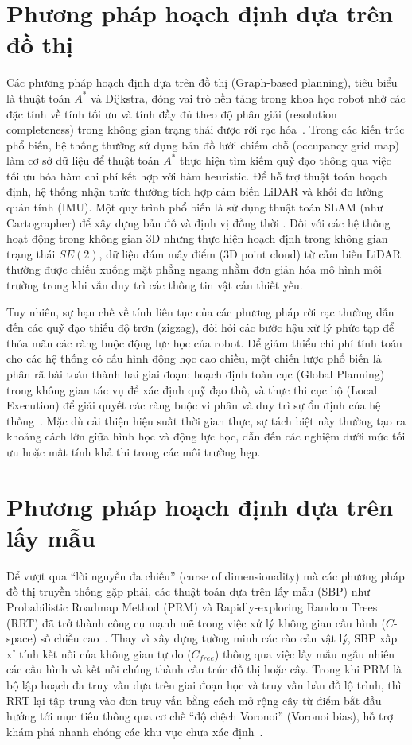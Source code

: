 \section{Phương pháp hoạch định dựa trên đồ thị}

Các phương pháp hoạch định dựa trên đồ thị (Graph-based planning), tiêu biểu là thuật toán $A^*$ và Dijkstra, đóng vai trò nền tảng trong khoa học robot nhờ các đặc tính về tính tối ưu và tính đầy đủ theo độ phân giải (resolution completeness) trong không gian trạng thái được rời rạc hóa~\cite{LaValle2006}. Trong các kiến trúc phổ biến, hệ thống thường sử dụng bản đồ lưới chiếm chỗ (occupancy grid map) làm cơ sở dữ liệu để thuật toán $A^*$ thực hiện tìm kiếm quỹ đạo thông qua việc tối ưu hóa hàm chi phí kết hợp với hàm heuristic. Để hỗ trợ thuật toán hoạch định, hệ thống nhận thức thường tích hợp cảm biến LiDAR và khối đo lường quán tính (IMU). Một quy trình phổ biến là sử dụng thuật toán SLAM (như Cartographer) để xây dựng bản đồ và định vị đồng thời \cite{TandonEtAl2024}. Đối với các hệ thống hoạt động trong không gian 3D nhưng thực hiện hoạch định trong không gian trạng thái $SE(2)$, dữ liệu đám mây điểm (3D point cloud) từ cảm biến LiDAR thường được chiếu xuống mặt phẳng ngang nhằm đơn giản hóa mô hình môi trường trong khi vẫn duy trì các thông tin vật cản thiết yếu.

Tuy nhiên, sự hạn chế về tính liên tục của các phương pháp rời rạc thường dẫn đến các quỹ đạo thiếu độ trơn (zigzag), đòi hỏi các bước hậu xử lý phức tạp để thỏa mãn các ràng buộc động lực học của robot. Để giảm thiểu chi phí tính toán cho các hệ thống có cấu hình động học cao chiều, một chiến lược phổ biến là phân rã bài toán thành hai giai đoạn: hoạch định toàn cục (Global Planning) trong không gian tác vụ để xác định quỹ đạo thô, và thực thi cục bộ (Local Execution) để giải quyết các ràng buộc vi phân và duy trì sự ổn định của hệ thống~\cite{TandonEtAl2024}. Mặc dù cải thiện hiệu suất thời gian thực, sự tách biệt này thường tạo ra khoảng cách lớn giữa hình học và động lực học, dẫn đến các nghiệm dưới mức tối ưu hoặc mất tính khả thi trong các môi trường hẹp.

\section{Phương pháp hoạch định dựa trên lấy mẫu}

Để vượt qua ``lời nguyền đa chiều'' (curse of dimensionality) mà các phương pháp đồ thị truyền thống gặp phải, các thuật toán dựa trên lấy mẫu (SBP) như Probabilistic Roadmap Method (PRM) và Rapidly-exploring Random Trees (RRT) đã trở thành công cụ mạnh mẽ trong việc xử lý không gian cấu hình ($C$-space) số chiều cao~\cite{LaValle1998}. Thay vì xây dựng tường minh các rào cản vật lý, SBP xấp xỉ tính kết nối của không gian tự do ($C_{free}$) thông qua việc lấy mẫu ngẫu nhiên các cấu hình và kết nối chúng thành cấu trúc đồ thị hoặc cây. Trong khi PRM là bộ lập hoạch đa truy vấn dựa trên giai đoạn học và truy vấn bản đồ lộ trình, thì RRT lại tập trung vào đơn truy vấn bằng cách mở rộng cây từ điểm bắt đầu hướng tới mục tiêu thông qua cơ chế ``độ chệch Voronoi'' (Voronoi bias), hỗ trợ khám phá nhanh chóng các khu vực chưa xác định~\cite{LaValle1998}.

